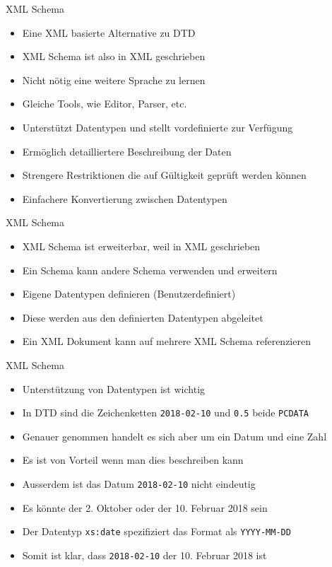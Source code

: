 \documentclass{beamer}
\begin{document}
\begin{frame}{XML Schema}
	
	\begin{itemize}
		\item Eine XML basierte Alternative zu DTD
		\item XML Schema ist also in XML geschrieben
		\item Nicht nötig eine weitere Sprache zu lernen
		\item Gleiche Tools, wie Editor, Parser, etc.
		\item Unterstützt Datentypen und stellt vordefinierte zur Verfügung
		\item Ermöglich detailliertere Beschreibung der Daten
		\item Strengere Restriktionen die auf Gültigkeit geprüft werden können
		\item Einfachere Konvertierung zwischen Datentypen
	\end{itemize}
	
\end{frame}

\begin{frame}{XML Schema}
	
	\begin{itemize}
		\item XML Schema ist erweiterbar, weil in XML geschrieben
		\item Ein Schema kann andere Schema verwenden und erweitern
		\item Eigene Datentypen definieren (Benutzerdefiniert)
		\item Diese werden aus den definierten Datentypen abgeleitet
		\item Ein XML Dokument kann auf mehrere XML Schema referenzieren
	\end{itemize}
	
\end{frame}

\begin{frame}{XML Schema}
	
	\begin{itemize}
		\item Unterstützung von Datentypen ist wichtig
		\item In DTD sind die Zeichenketten \texttt{2018-02-10} und \texttt{0.5} beide \texttt{PCDATA}
		\item Genauer genommen handelt es sich aber um ein Datum und eine Zahl
		\item Es ist von Vorteil wenn man dies beschreiben kann
		\item Ausserdem ist das Datum \texttt{2018-02-10} nicht eindeutig
		\item Es könnte der 2. Oktober oder der 10. Februar 2018 sein
		\item Der Datentyp \texttt{xs:date} spezifiziert das Format als \texttt{YYYY-MM-DD}
		\item Somit ist klar, dass \texttt{2018-02-10} der 10. Februar 2018 ist
	\end{itemize}
	
\end{frame}
\end{document}
